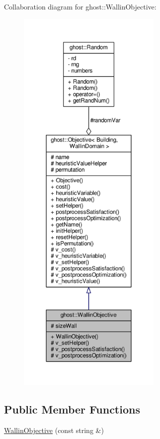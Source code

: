 Collaboration diagram for ghost\-:\-:Wallin\-Objective\-:
\nopagebreak
\begin{figure}[H]
\begin{center}
\leavevmode
\includegraphics[height=550pt]{classghost_1_1WallinObjective__coll__graph}
\end{center}
\end{figure}
\subsection*{Public Member Functions}
\begin{DoxyCompactItemize}
\item 
\hyperlink{classghost_1_1WallinObjective_a4730f5d345b053d92b9c55b5ebfe5716}{Wallin\-Objective} (const string \&)
\end{DoxyCompactItemize}
